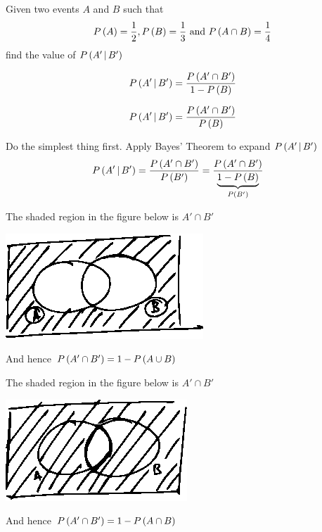 \documentclass[14pt,fleqn]{extarticle}
\begin{document}
 
\begin{question}
	\statement 
    
    Given two events $A$ and $B$ such that 
    \[ P\left( A\right) = \frac{1}{2}, P\left( B\right) = \frac{1}{3} \text{ and } P\left( A\cap B\right) = \frac{1}{4} \]
    find the value of $P\left(A'\,\vert\,B'\right)$ 
          
          
   \begin{step}
  \begin{options} 
     \correct 
       
       \[ P\left(A'\,\vert\,B'\right) = \dfrac{P\left( A'\cap B'\right)}{1-P\left( B\right)} \]
       
     \incorrect
        
     \[ P\left(A'\,\vert\,B'\right) = \dfrac{P\left( A'\cap B'\right)}{P\left( B\right)} \]
     
    \end{options} 
     \reason 
     
     Do the simplest thing first. Apply Bayes' Theorem to expand $P\left(A'\,\vert\,B'\right)$
     \begin{align}
	P\left(A'\,\vert\,B'\right) &= \dfrac{P\left( A'\cap B'\right)}{P\left( B'\right)} = \dfrac{P\left( A'\cap B'\right)}{\underbrace{1-P\left( B\right)}_{P\left( B'\right)}} 
\end{align}
       
\end{step}

\begin{step}
  \begin{options} 
     \correct 
       
       The shaded region in the figure below is $A'\cap B'$ 
       
       \begin{center}
\includegraphics[scale=1.5]{1411-A.eps}
\end{center}
       And hence $P\left( A'\cap B'\right) =  1-P\left( A\cup B\right)$ 
       
     \incorrect
        
        The shaded region in the figure below is $A'\cap B'$ 
       
       \begin{center}
\includegraphics[scale=1.5]{1411-B.eps}
\end{center}
       And hence $P\left( A'\cap B'\right) =  1-P\left( A\cap B\right)$ 
    \end{options} 
     \reason 
       

\end{step}
\end{question}
\end{document}
